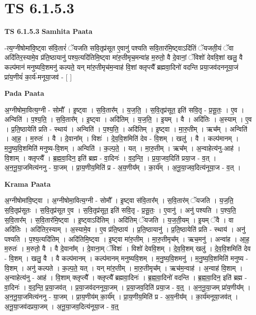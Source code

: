 \documentclass[17pt]{extarticle}
\begin{document}
\section{ TS 6.1.5.3 }

\textbf{TS 6.1.5.3 } \newline
\textbf{Samhita Paata} \newline

-त्य॒ग्नीषोमा॑वि॒ष्ट्वा स॑वि॒तारं॑ ॅयजति सवि॒तृप्र॑सूत ए॒वानु॑ पश्यति सवि॒तार॑मि॒ष्ट्वाऽदि॑तिं ॅयजती॒यं ॅवा अदि॑तिर॒स्यामे॒व प्र॑ति॒ष्ठायानु॑ पश्य॒त्यदि॑तिमि॒ष्ट्वा मा॑रु॒तीमृच॒मन्वा॑ह म॒रुतो॒ वै दे॒वानां॒ ॅविशो॑ देववि॒शां खलु॒ वै कल्प॑मानं मनुष्यवि॒शमनु॑ कल्पते॒ यन् मा॑रु॒तीमृच॑म॒न्वाह॑ वि॒शां क्लृप्त्यै᳚ ब्रह्मवा॒दिनो॑ वदन्ति प्रया॒जव॑दननूया॒जं प्रा॑य॒णीयं॑ का॒र्य॑-मनूया॒जव॑ - [  ] \newline

\textbf{Pada Paata} \newline

अ॒ग्नीषोमा॒वित्य॒ग्नी - सोमौ᳚ । इ॒ष्ट्वा । स॒वि॒तार᳚म् । य॒ज॒ति॒ । स॒वि॒तृप्र॑सूत॒ इति॑ सवि॒तृ - प्र॒सू॒तः॒ । ए॒व । अन्विति॑ । प॒श्य॒ति॒ । स॒वि॒तार᳚म् । इ॒ष्ट्वा । अदि॑तिम् । य॒ज॒ति॒ । इ॒यम् । वै । अदि॑तिः । अ॒स्याम् । ए॒व । प्र॒ति॒ष्ठायेति॑ प्रति - स्थाय॑ । अन्विति॑ । प॒श्य॒ति॒ । अदि॑तिम् । इ॒ष्ट्वा । मा॒रु॒तीम् । ऋच᳚म् । अन्विति॑ । आ॒ह॒ । म॒रुतः॑ । वै । दे॒वाना᳚म् । विशः॑ । दे॒व॒वि॒शमिति॑ देव - वि॒शम् । खलु॑ । वै । कल्प॑मानम् । म॒नु॒ष्य॒वि॒शमिति॑ मनुष्य-वि॒शम् । अन्विति॑ । क॒ल्प॒ते॒ । यत् । मा॒रु॒तीम् । ऋच᳚म् । अ॒न्वाहेत्य॑नु-आह॑ । वि॒शाम् । क्लृप्त्यै᳚ । ब्र॒ह्म॒वा॒दिन॒ इति॑ ब्रह्म - वा॒दिनः॑ । व॒द॒न्ति॒ । प्र॒या॒जव॒दिति॑ प्रया॒ज - व॒त् । अ॒न॒नू॒या॒जमित्य॑ननु - या॒जम् । प्रा॒य॒णीय॒मिति॑ प्र - अ॒य॒णीय᳚म् । का॒र्य᳚म् । अ॒नू॒या॒जव॒दित्य॑नूया॒ज - व॒त् ।  \newline


\textbf{Krama Paata} \newline

अ॒ग्नीषोमा॑वि॒ष्ट्वा । अ॒ग्नीषोमा॒वित्य॒ग्नी - सोमौ᳚ । इ॒ष्ट्वा स॑वि॒तार᳚म् । स॒वि॒तार॑म् ॅयजति । य॒ज॒ति॒ स॒वि॒तृप्र॑सूतः । स॒वि॒तृप्र॑सूत ए॒व । स॒वि॒तृप्र॑सूत॒ इति॑ सवि॒तृ - प्र॒सू॒तः॒ । ए॒वानु॑ । अनु॑ पश्यति । प॒श्य॒ति॒ स॒वि॒तार᳚म् । स॒वि॒तार॑मि॒ष्ट्वा । इ॒ष्ट्वाऽदि॑तिम् । अदि॑तिम् ॅयजति । य॒ज॒ती॒यम् । इ॒यम् ॅवै । वा अदि॑तिः । अदि॑तिर॒स्याम् । अ॒स्यामे॒व । ए॒व प्र॑ति॒ष्ठाय॑ । प्र॒ति॒ष्ठायानु॑ । प्र॒ति॒ष्ठायेति॑ प्रति - स्थाय॑ । अनु॑ पश्यति । प॒श्य॒त्यदि॑तिम् । अदि॑तिमि॒ष्ट्वा । इ॒ष्ट्वा मा॑रु॒तीम् । मा॒रु॒तीमृच᳚म् । ऋच॒मनु॑ । अन्वा॑ह । आ॒ह॒ म॒रुतः॑ । म॒रुतो॒ वै । वै दे॒वाना᳚म् । दे॒वाना॒म् ॅविशः॑ । विशो॑ देववि॒शम् । दे॒व॒वि॒शम् खलु॑ । दे॒व॒वि॒शमिति॑ देव - वि॒शम् । खलु॒ वै । वै कल्प॑मानम् । कल्प॑मानम् मनुष्यवि॒शम् । म॒नु॒ष्य॒वि॒शमनु॑ । म॒नु॒ष्य॒वि॒शमिति॑ मनुष्य - वि॒शम् । अनु॑ कल्पते । क॒ल्प॒ते॒ यत् । यन् मा॑रु॒तीम् । मा॒रु॒तीमृच᳚म् । ऋच॑म॒न्वाह॑ । अ॒न्वाह॑ वि॒शाम् । अ॒न्वाहेत्य॑नु - आह॑ । वि॒शाम् क्लृप्त्यै᳚ । क्लृप्त्यै᳚ ब्रह्मवा॒दिनः॑ । ब्र॒ह्म॒वा॒दिनो॑ वदन्ति । ब्र॒ह्म॒वा॒दिन॒ इति॑ ब्रह्म - वा॒दिनः॑ । व॒द॒न्ति॒ प्र॒या॒जव॑त् । प्र॒या॒जव॑दननूया॒जम् । प्र॒या॒जव॒दिति॑ प्रया॒ज - व॒त्॒ । अ॒न॒नू॒या॒जम् प्रा॑य॒णीय᳚म् । अ॒न॒नू॒या॒जमित्य॑ननु - या॒जम् । प्रा॒य॒णीय॑म् का॒र्य᳚म् । प्रा॒य॒णीय॒मिति॑ प्र - अ॒य॒नीय᳚म् । का॒र्य॑मनूया॒जव॑त् । अ॒नू॒या॒जव॑दप्रया॒जम् । अ॒नू॒या॒जव॒दित्य॑नूया॒ज - व॒त्॒ \newline
\end{document}
